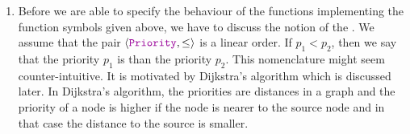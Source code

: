 \begin{Definition}
\begin{enumerate}
\begin{enumerate}
              The expression $Q.\mytt{insert}(p,v)$ inserts the  element $v$ into the priority queue $Q$.
              Furthermore, the priority of $v$ is set to be $p$.
        \item $\mytt{remove}: \mytt{PrioQueue} \rightarrow \mytt{PrioQueue}$

              The expression $Q.\mytt{remove}()$ removes from $Q$ the element that is returned by
              $Q.\mytt{top}()$.
        \item $\mytt{top}: \mytt{PrioQueue}  \rightarrow (\mytt{Priority} \times \mytt{Value}) \cup \{\Omega\}$

              The expression $Q.\mytt{top}()$ returns a pair $\pair(p,v)$.  Here,  $v$ is any
              element of $Q$ that has a  maximal priority among all elements in $Q$, while $p$ is
              the priority associated with $v$. 
        \item $\mytt{isEmpty}: \mytt{PrioQueue} \rightarrow \mathbb{B}$

              The expression $Q.\mytt{isEmpty}()$ checks whether the priority queue $Q$ is empty.
        \end{enumerate}
\item Before we are able to specify the behaviour of the functions implementing the function symbols
      given above, we have to discuss the notion of the .  We assume that the pair
      $\langle \mytt{Priority}, \leq \rangle$  is a linear order.
      If  $p_1 < p_2$, then we say that the priority $p_1$ is  than the priority $p_2$.  This
      nomenclature might seem counter-intuitive.  It is motivated by 
      Dijkstra's algorithm which is discussed later.  In Dijkstra's algorithm, the priorities are
      distances in a graph and the priority of a node is higher if the node is nearer to the source
      node and in that case the distance to the source is smaller.


\end{enumerate}
\end{Definition}
